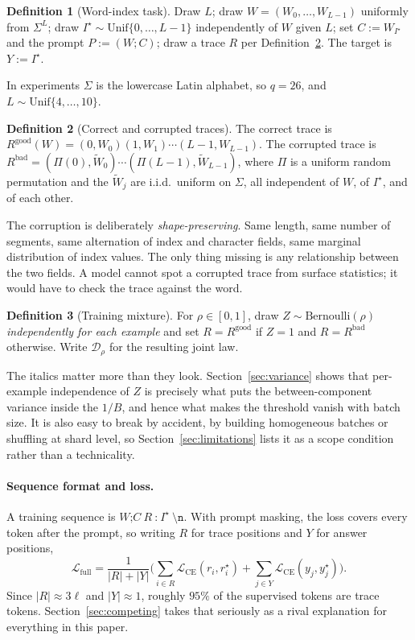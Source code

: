 \documentclass{article}
\theoremstyle{plain}
\theoremstyle{definition}
\newtheorem{definition}{Definition}
\theoremstyle{remark}
\newcommand{\1}{\mathbf{1}}
\newcommand{\cD}{\mathcal{D}}
\newcommand{\cL}{\mathcal{L}}
\newcommand{\good}{\mathrm{good}}
\newcommand{\bad}{\mathrm{bad}}
\begin{document}
\begin{definition}[Word-index task]
\label{def:task}
Draw $L$; draw $W = (W_0,\dots,W_{L-1})$ uniformly from $\Sigma^L$; draw
$I^\star\sim\mathrm{Unif}\{0,\dots,L-1\}$ independently of $W$ given $L$; set
$C := W_{I^\star}$ and the prompt $P := (W;C)$; draw a trace $R$ per
Definition~\ref{def:traces}. The target is $Y := I^\star$.
\end{definition}

In experiments $\Sigma$ is the lowercase Latin alphabet, so $q=26$, and
$L\sim\mathrm{Unif}\{4,\dots,10\}$.

\begin{definition}[Correct and corrupted traces]
\label{def:traces}
The correct trace is $R^{\good}(W) = (0,W_0)(1,W_1)\cdots(L-1,W_{L-1})$. The
corrupted trace is
$R^{\bad} = (\Pi(0),\widetilde W_0)\cdots(\Pi(L-1),\widetilde W_{L-1})$, where
$\Pi$ is a uniform random permutation and the $\widetilde W_j$ are i.i.d.\
uniform on $\Sigma$, all independent of $W$, of $I^\star$, and of each other.
\end{definition}

The corruption is deliberately \emph{shape-preserving}. Same length, same number
of segments, same alternation of index and character fields, same marginal
distribution of index values. The only thing missing is any relationship between
the two fields. A model cannot spot a corrupted trace from surface statistics; it
would have to check the trace against the word.

\begin{definition}[Training mixture]
\label{def:mixture}
For $\rho\in[0,1]$, draw $Z\sim\mathrm{Bernoulli}(\rho)$ \emph{independently for
each example} and set $R = R^{\good}$ if $Z=1$ and $R=R^{\bad}$ otherwise. Write
$\cD_\rho$ for the resulting joint law.
\end{definition}

The italics matter more than they look. Section~\ref{sec:variance} shows that
per-example independence of $Z$ is precisely what puts the between-component
variance inside the $1/B$, and hence what makes the threshold vanish with batch
size. It is also easy to break by accident, by building homogeneous batches or
shuffling at shard level, so Section~\ref{sec:limitations} lists it as a scope
condition rather than a technicality.

\paragraph{Sequence format and loss.}
A training sequence is $W\texttt{;}C\ R\ \texttt{:}\ I^\star\
\texttt{\textbackslash n}$. With prompt masking, the loss covers every token
after the prompt, so writing $R$ for trace positions and $Y$ for answer
positions,
\begin{equation}
\label{eq:lfull}
\cL_{\mathrm{full}}
= \frac{1}{|R| + |Y|}\Big(
\sum_{i \in R}\cL_{\mathrm{CE}}(r_i, r_i^\star)
+ \sum_{j \in Y}\cL_{\mathrm{CE}}(y_j, y_j^\star)\Big).
\end{equation}
Since $|R|\approx3\ell$ and $|Y|\approx1$, roughly $95\%$ of the supervised
tokens are trace tokens. Section~\ref{sec:competing} takes that seriously as a
rival explanation for everything in this paper.
\end{document}
